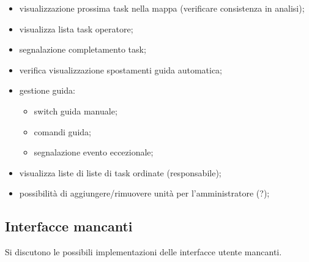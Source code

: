 \begin{itemize}
\begin{itemize}
        \end{itemize}
        \item visualizzazione prossima task nella mappa (verificare consistenza in analisi);
        \item visualizza lista task operatore;
        \item segnalazione completamento task;
        \item verifica visualizzazione spostamenti guida automatica;
        \item gestione guida:
        \begin{itemize}
            \item switch guida manuale;
            \item comandi guida;
            \item segnalazione evento eccezionale;
        \end{itemize}
        \item visualizza liste di liste di task ordinate (responsabile);
        \item possibilità di aggiungere/rimuovere unità per l'amministratore (?);
    \end{itemize}



\subsection{Interfacce mancanti}
\label{ui}
    Si discutono le possibili implementazioni delle interfacce utente mancanti.
